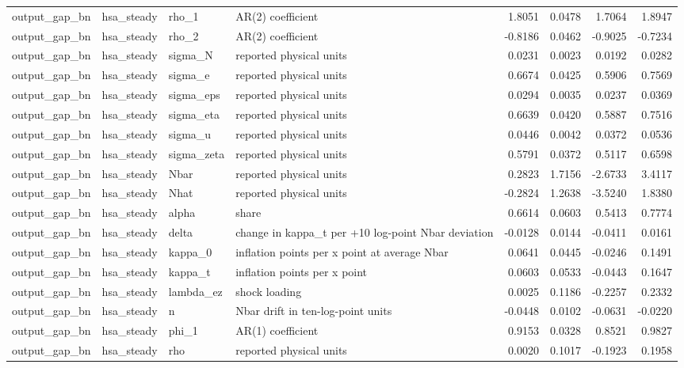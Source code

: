 \begin{tabular}{llllrrrr}
output\_gap\_bn & hsa\_steady & rho\_1 & AR(2) coefficient & 1.8051 & 0.0478 & 1.7064 & 1.8947 \\
output\_gap\_bn & hsa\_steady & rho\_2 & AR(2) coefficient & -0.8186 & 0.0462 & -0.9025 & -0.7234 \\
output\_gap\_bn & hsa\_steady & sigma\_N & reported physical units & 0.0231 & 0.0023 & 0.0192 & 0.0282 \\
output\_gap\_bn & hsa\_steady & sigma\_e & reported physical units & 0.6674 & 0.0425 & 0.5906 & 0.7569 \\
output\_gap\_bn & hsa\_steady & sigma\_eps & reported physical units & 0.0294 & 0.0035 & 0.0237 & 0.0369 \\
output\_gap\_bn & hsa\_steady & sigma\_eta & reported physical units & 0.6639 & 0.0420 & 0.5887 & 0.7516 \\
output\_gap\_bn & hsa\_steady & sigma\_u & reported physical units & 0.0446 & 0.0042 & 0.0372 & 0.0536 \\
output\_gap\_bn & hsa\_steady & sigma\_zeta & reported physical units & 0.5791 & 0.0372 & 0.5117 & 0.6598 \\
output\_gap\_bn & hsa\_steady & Nbar & reported physical units & 0.2823 & 1.7156 & -2.6733 & 3.4117 \\
output\_gap\_bn & hsa\_steady & Nhat & reported physical units & -0.2824 & 1.2638 & -3.5240 & 1.8380 \\
output\_gap\_bn & hsa\_steady & alpha & share & 0.6614 & 0.0603 & 0.5413 & 0.7774 \\
output\_gap\_bn & hsa\_steady & delta & change in kappa\_t per +10 log-point Nbar deviation & -0.0128 & 0.0144 & -0.0411 & 0.0161 \\
output\_gap\_bn & hsa\_steady & kappa\_0 & inflation points per x point at average Nbar & 0.0641 & 0.0445 & -0.0246 & 0.1491 \\
output\_gap\_bn & hsa\_steady & kappa\_t & inflation points per x point & 0.0603 & 0.0533 & -0.0443 & 0.1647 \\
output\_gap\_bn & hsa\_steady & lambda\_ez & shock loading & 0.0025 & 0.1186 & -0.2257 & 0.2332 \\
output\_gap\_bn & hsa\_steady & n & Nbar drift in ten-log-point units & -0.0448 & 0.0102 & -0.0631 & -0.0220 \\
output\_gap\_bn & hsa\_steady & phi\_1 & AR(1) coefficient & 0.9153 & 0.0328 & 0.8521 & 0.9827 \\
output\_gap\_bn & hsa\_steady & rho & reported physical units & 0.0020 & 0.1017 & -0.1923 & 0.1958 \\

\end{tabular}
